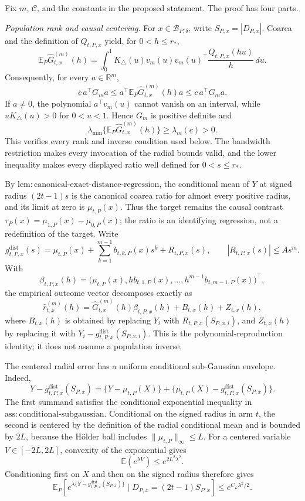 Fix \(m\), \(\mathcal C\), and the constants in the proposed statement.  The proof has four parts.

\emph{Population rank and causal centering.}
For \(x\in\mathcal B_{P,\delta}\), write \(S_{P,x}=|D_{P,x}|\).  Coarea and the definition of \(Q_{t,P,x}\) yield, for \(0<h\leq r_*\),
\[
 \mathbb E_P\widehat G^{(m)}_{t,x}(h)
 =\int_0^1 K_\triangle(u)v_m(u)v_m(u)^\top
 \frac{Q_{t,P,x}(hu)}h\,du.
\]
Consequently, for every \(a\in\mathbb R^m\),
\[
 \underline c\,a^\top G_ma
 \leq a^\top\mathbb E_P\widehat G^{(m)}_{t,x}(h)a
 \leq \overline c\,a^\top G_ma.
\]
If \(a\neq0\), the polynomial \(a^\top v_m(u)\) cannot vanish on an interval, while \(uK_\triangle(u)>0\) for \(0<u<1\).  Hence \(G_m\) is positive definite and
\[
 \lambda_{\min}\{\mathbb E_P\widehat G^{(m)}_{t,x}(h)\}
 \geq\lambda_m(\underline c)>0.
\]
This verifies every rank and inverse condition used below.  The bandwidth restriction makes every invocation of the radial bounds valid, and the lower inequality makes every displayed ratio well defined for \(0<s\leq r_*\).

By \(\mathrm{lem:canonical\text{-}exact\text{-}distance\text{-}regression}\), the conditional mean of \(Y\) at signed radius \((2t-1)s\) is the canonical coarea ratio for almost every positive radius, and its limit at zero is \(\mu_{t,P}(x)\).  Thus the target remains the causal contrast \(\tau_P(x)=\mu_{1,P}(x)-\mu_{0,P}(x)\); the ratio is an identifying regression, not a redefinition of the target.  Write
\[
 g^{\mathrm{dist}}_{t,P,x}(s)
 =\mu_{t,P}(x)+\sum_{k=1}^{m-1}b_{t,k,P}(x)s^k
 +R_{t,P,x}(s),
 \qquad |R_{t,P,x}(s)|\leq As^m.
\]
With
\[
 \beta_{t,P,x}(h)
 =\bigl(\mu_{t,P}(x),hb_{t,1,P}(x),\ldots,
 h^{m-1}b_{t,m-1,P}(x)\bigr)^\top,
\]
the empirical outcome vector decomposes exactly as
\[
 \widehat r^{(m)}_{t,x}(h)
 =\widehat G^{(m)}_{t,x}(h)\beta_{t,P,x}(h)
 +B_{t,x}(h)+Z_{t,x}(h),
\]
where \(B_{t,x}(h)\) is obtained by replacing \(Y_i\) with \(R_{t,P,x}(S_{P,x,i})\), and \(Z_{t,x}(h)\) by replacing it with
\(Y_i-g^{\mathrm{dist}}_{t,P,x}(S_{P,x,i})\).  This is the polynomial-reproduction identity; it does not assume a population inverse.

The centered radial error has a uniform conditional sub-Gaussian envelope.  Indeed,
\[
 Y-g^{\mathrm{dist}}_{t,P,x}(S_{P,x})
 =\{Y-\mu_{t,P}(X)\}
 +\{\mu_{t,P}(X)-g^{\mathrm{dist}}_{t,P,x}(S_{P,x})\}.
\]
The first summand satisfies the conditional exponential inequality in \(\mathrm{ass:conditional\text{-}subgaussian}\).  Conditional on the signed radius in arm \(t\), the second is centered by the definition of the radial conditional mean and is bounded by \(2L\), because the H\"older ball includes \(\|\mu_{t,P}\|_\infty\leq L\).  For a centered variable \(V\in[-2L,2L]\), convexity of the exponential gives
\[
 \mathbb E(e^{\lambda V})\leq e^{2L^2\lambda^2}.
\]
Conditioning first on \(X\) and then on the signed radius therefore gives
\[
 \mathbb E_P\!\left[
 e^{\lambda\{Y-g^{\mathrm{dist}}_{t,P,x}(S_{P,x})\}}
 \mid D_{P,x}=(2t-1)S_{P,x}
 \right]
 \leq e^{C_L\lambda^2/2}.
\]

